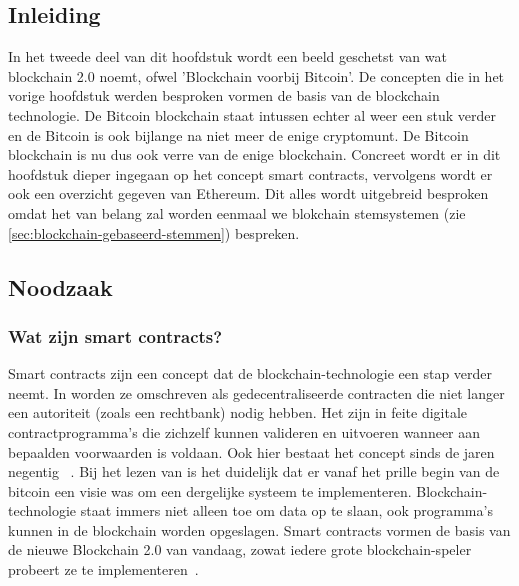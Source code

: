 	\subsection*{Inleiding}
		In het tweede deel van dit hoofdstuk wordt een beeld geschetst van wat \textcite{Swan2015} blockchain 2.0 noemt, ofwel 'Blockchain voorbij Bitcoin'. De concepten die in het vorige hoofdstuk werden besproken vormen de basis van de blockchain technologie. De Bitcoin blockchain staat intussen echter al weer een stuk verder en de Bitcoin is ook bijlange na niet meer de enige cryptomunt. De Bitcoin blockchain is nu dus ook verre van de enige blockchain. Concreet wordt er in dit hoofdstuk dieper ingegaan op het concept  smart contracts, vervolgens wordt er ook een overzicht gegeven van Ethereum. Dit alles wordt uitgebreid besproken omdat het van belang zal worden eenmaal we blokchain stemsystemen (zie \ref{sec:blockchain-gebaseerd-stemmen}) bespreken. \autocite{Buterin2014}
	\subsection{Noodzaak}
		\subsubsection{Wat  zijn smart contracts?}
			Smart contracts zijn een concept dat de blockchain-technologie een stap verder neemt. In \textcite{Swan2015} worden ze omschreven als gedecentraliseerde contracten die niet langer een autoriteit (zoals een rechtbank) nodig hebben. Het zijn in feite digitale contractprogramma’s die zichzelf kunnen valideren en uitvoeren wanneer aan bepaalden voorwaarden is voldaan. Ook hier bestaat het concept sinds de jaren negentig ~\autocite{Szabo1996}. Bij het lezen van \textcite{Nakamoto2008} is het duidelijk dat er vanaf het prille begin van de bitcoin een visie was om een dergelijke systeem te implementeren. Blockchain-technologie staat immers niet alleen toe om data op te slaan, ook programma’s kunnen in de blockchain worden opgeslagen. Smart contracts vormen de basis van de nieuwe Blockchain 2.0 van vandaag, zowat iedere grote blockchain-speler probeert ze te implementeren~\autocite{Swan2015}.
